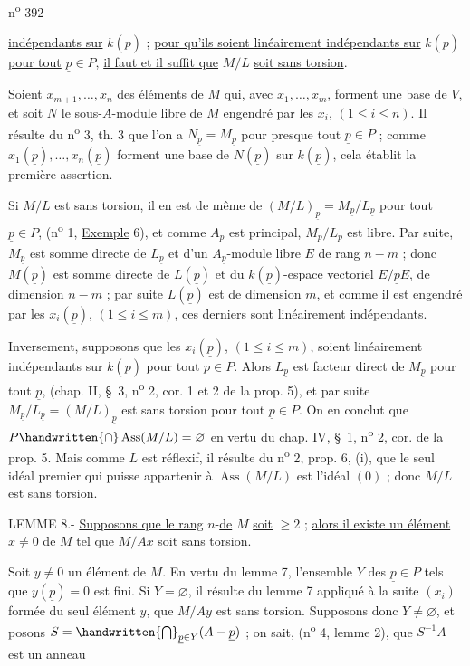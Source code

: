 n\textsuperscript{o} 392

\uline{indépendants sur} $k(\underline p)$ ; \uline{pour qu'ils soient linéairement indépendants sur} $k(\underline p)$ \uline{pour tout} $\underline p\in P$, \uline{il faut et il suffit que} $M/L$ \uline{soit sans torsion}.

Soient $x_{m+1},\ldots,x_n$ des éléments de $M$ qui, avec $x_1,\ldots,x_m$, forment une base de $V$, et soit $N$ le sous-$A$-module libre de $M$ engendré par les $x_i$, $(1\leq i\leq n)$. Il résulte du n\textsuperscript{o} 3, th. 3 que l'on a $N_{\underline p}=M_{\underline p}$ pour presque tout $\underline p\in P$ ; comme $x_1(\underline p),\ldots,x_n(\underline p)$ forment une base de $N(\underline p)$ sur $k(\underline p)$, cela établit la première assertion.

Si $M/L$ est sans torsion, il en est de même de $(M/L)_{\underline p}=M_{\underline p}/L_{\underline p}$ pour tout $\underline p\in P$, (n\textsuperscript{o} 1, \uline{Exemple} 6), et comme $A_{\underline p}$ est principal, $M_{\underline p}/L_{\underline p}$ est libre. Par suite, $M_{\underline p}$ est somme directe de $L_{\underline p}$ et d'un $A_{\underline p}$-module libre $E$ de rang $n-m$ ; donc $M(\underline p)$ est somme directe de $L(\underline p)$ et du $k(\underline p)$-espace vectoriel $E/\underline p E$, de dimension $n-m$ ; par suite $L(\underline p)$ est de dimension $m$, et comme il est engendré par les $x_i(\underline p)$, $(1\leq i\leq m)$, ces derniers sont linéairement indépendants.

Inversement, supposons que les $x_i(\underline p)$, $(1\leq i\leq m)$, soient linéairement indépendants sur $k(\underline p)$ pour tout $\underline p\in P$. Alors $L_{\underline p}$ est facteur direct de $M_{\underline p}$ pour tout $\underline p$, (chap. II, \S~3, n\textsuperscript{o} 2, cor. 1 et 2 de la prop. 5), et par suite $M_{\underline p}/L_{\underline p}=(M/L)_{\underline p}$ est sans torsion pour tout $\underline p\in P$. On en conclut que $P\handwritten{\cap}\operatorname{Ass}(M/L)=\varnothing$ en vertu du chap. IV, \S~1, n\textsuperscript{o} 2, cor. de la prop. 5. Mais comme $L$ est réflexif, il résulte du n\textsuperscript{o} 2, prop. 6, (i), que le seul idéal premier qui puisse appartenir à $\operatorname{Ass}(M/L)$ est l'idéal $(0)$ ; donc $M/L$ est sans torsion.

LEMME 8.- \uline{Supposons que le rang} $n$-\uline{de} $M$ \uline{soit} $\geq 2$ ; \uline{alors il existe un élément} $x\neq 0$ \uline{de} $M$ \uline{tel que} $M/Ax$ \uline{soit sans torsion}.

Soit $y\neq 0$ un élément de $M$. En vertu du lemme 7, l'ensemble $Y$ des $\underline p\in P$ tels que $y(\underline p)=0$ est fini. Si $Y=\varnothing$, il résulte du lemme 7 appliqué à la suite $(x_i)$ formée du seul élément $y$, que $M/Ay$ est sans torsion. Supposons donc $Y\neq\varnothing$, et posons $S=\handwritten{\bigcap}_{\underline p\in Y}(A-\underline p)$ ; on sait, (n\textsuperscript{o} 4, lemme 2), que $S^{-1}A$ est un anneau
